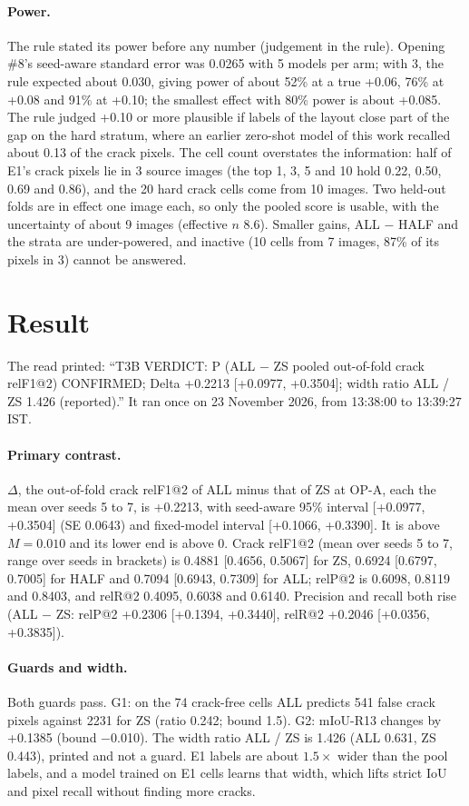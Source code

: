 \paragraph{Power.} The rule stated its power before any number (judgement in the rule). Opening \#8's seed-aware standard error was
0.0265 with 5 models per arm; with 3, the rule expected about 0.030, giving power of about 52\% at a true +0.06, 76\% at +0.08 and
91\% at +0.10; the smallest effect with 80\% power is about +0.085. The rule judged +0.10 or more plausible if labels of the layout
close part of the gap on the hard stratum, where an earlier zero-shot model of this work recalled about 0.13 of the crack pixels.
The cell count overstates the information: half of E1's crack pixels lie in 3 source images (the top 1, 3, 5 and 10 hold 0.22,
0.50, 0.69 and 0.86), and the 20 hard crack cells come from 10 images. Two held-out folds are in effect one image each, so only the
pooled score is usable, with the uncertainty of about 9 images (effective $n$ 8.6). Smaller gains, ALL $-$ HALF and the strata are
under-powered, and inactive (10 cells from 7 images, 87\% of its pixels in 3) cannot be answered.

\section{Result}\label{sec:t3b-result}

The read printed: ``T3B VERDICT: P (ALL $-$ ZS pooled out-of-fold crack relF1@2) CONFIRMED; Delta +0.2213 [+0.0977, +0.3504];
width ratio ALL / ZS 1.426 (reported).'' It ran once on 23 November 2026, from 13:38:00 to 13:39:27 IST.

\paragraph{Primary contrast.} $\Delta$, the out-of-fold crack relF1@2 of ALL minus that of ZS at OP-A, each the mean over seeds 5
to 7, is +0.2213, with seed-aware 95\% interval [+0.0977, +0.3504] (SE 0.0643) and fixed-model interval [+0.1066, +0.3390]. It is
above $M=0.010$ and its lower end is above 0. Crack relF1@2 (mean over seeds 5 to 7, range over seeds in brackets) is 0.4881
[0.4656, 0.5067] for ZS, 0.6924 [0.6797, 0.7005] for HALF and 0.7094 [0.6943, 0.7309] for ALL; relP@2 is 0.6098, 0.8119 and
0.8403, and relR@2 0.4095, 0.6038 and 0.6140. Precision and recall both rise (ALL $-$ ZS: relP@2 +0.2306 [+0.1394, +0.3440],
relR@2 +0.2046 [+0.0356, +0.3835]).

\paragraph{Guards and width.} Both guards pass. G1: on the 74 crack-free cells ALL predicts 541 false crack pixels against 2231
for ZS (ratio 0.242; bound 1.5). G2: mIoU-R13 changes by +0.1385 (bound $-$0.010). The width ratio ALL / ZS is 1.426 (ALL 0.631,
ZS 0.443), printed and not a guard. E1 labels are about $1.5\times$ wider than the pool labels, and a model trained on E1 cells
learns that width, which lifts strict IoU and pixel recall without finding more cracks.

